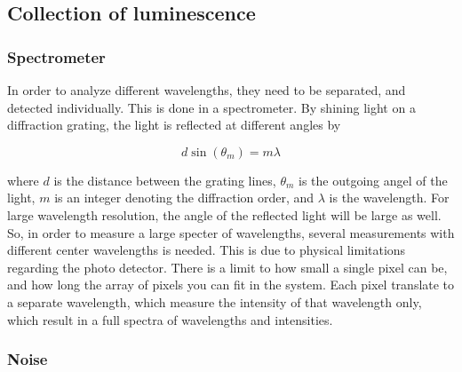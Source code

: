 \subsection{Collection of luminescence}


\subsubsection{Spectrometer}

In order to analyze different wavelengths, they need to be separated, and detected individually. This is done in a spectrometer. By shining light on a diffraction grating, the light is reflected at different angles by

\begin{equation}
d\sin(\theta _m)=m\lambda
\label{eq:grating_equation}
\end{equation}

where $d$ is the distance between the grating lines, $\theta _m$ is the outgoing angel of the light, $m$ is an integer denoting the diffraction order, and $\lambda$ is the wavelength. For large wavelength resolution, the angle of the reflected light will be large as well. So, in order to measure a large specter of wavelengths, several measurements with different center wavelengths is needed. This is due to physical limitations regarding the photo detector. There is a limit to how small a single pixel can be, and how long the array of pixels you can fit in the system. Each pixel translate to a separate wavelength, which measure the intensity of that wavelength only, which result in a full spectra of wavelengths and intensities. 

\subsubsection{Noise}


